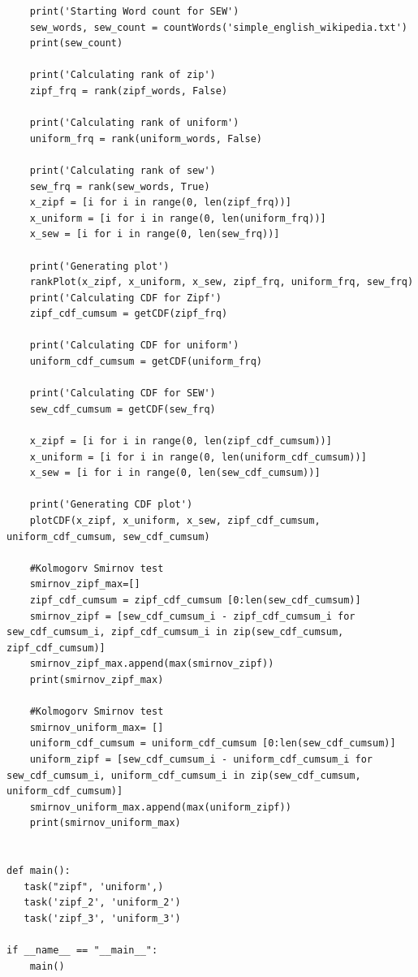 \documentclass{WeSTassignment}
\begin{document}
\begin{lstlisting}
    print('Starting Word count for SEW')
    sew_words, sew_count = countWords('simple_english_wikipedia.txt')
    print(sew_count)
    
    print('Calculating rank of zip')
    zipf_frq = rank(zipf_words, False)

    print('Calculating rank of uniform')
    uniform_frq = rank(uniform_words, False)

    print('Calculating rank of sew')
    sew_frq = rank(sew_words, True)
    x_zipf = [i for i in range(0, len(zipf_frq))]
    x_uniform = [i for i in range(0, len(uniform_frq))]
    x_sew = [i for i in range(0, len(sew_frq))]

    print('Generating plot')
    rankPlot(x_zipf, x_uniform, x_sew, zipf_frq, uniform_frq, sew_frq)
    print('Calculating CDF for Zipf')
    zipf_cdf_cumsum = getCDF(zipf_frq)

    print('Calculating CDF for uniform')
    uniform_cdf_cumsum = getCDF(uniform_frq)

    print('Calculating CDF for SEW')
    sew_cdf_cumsum = getCDF(sew_frq)

    x_zipf = [i for i in range(0, len(zipf_cdf_cumsum))]
    x_uniform = [i for i in range(0, len(uniform_cdf_cumsum))]
    x_sew = [i for i in range(0, len(sew_cdf_cumsum))]
    
    print('Generating CDF plot')
    plotCDF(x_zipf, x_uniform, x_sew, zipf_cdf_cumsum, uniform_cdf_cumsum, sew_cdf_cumsum)
    
    #Kolmogorv Smirnov test 
    smirnov_zipf_max=[]
    zipf_cdf_cumsum = zipf_cdf_cumsum [0:len(sew_cdf_cumsum)]
    smirnov_zipf = [sew_cdf_cumsum_i - zipf_cdf_cumsum_i for sew_cdf_cumsum_i, zipf_cdf_cumsum_i in zip(sew_cdf_cumsum, zipf_cdf_cumsum)]
    smirnov_zipf_max.append(max(smirnov_zipf))
    print(smirnov_zipf_max)

    #Kolmogorv Smirnov test 
    smirnov_uniform_max= []
    uniform_cdf_cumsum = uniform_cdf_cumsum [0:len(sew_cdf_cumsum)]
    uniform_zipf = [sew_cdf_cumsum_i - uniform_cdf_cumsum_i for sew_cdf_cumsum_i, uniform_cdf_cumsum_i in zip(sew_cdf_cumsum, uniform_cdf_cumsum)]
    smirnov_uniform_max.append(max(uniform_zipf))
    print(smirnov_uniform_max)
    

def main():
   task("zipf", 'uniform',)
   task('zipf_2', 'uniform_2')
   task('zipf_3', 'uniform_3')

if __name__ == "__main__":
    main()

\end{lstlisting}
\end{document}
